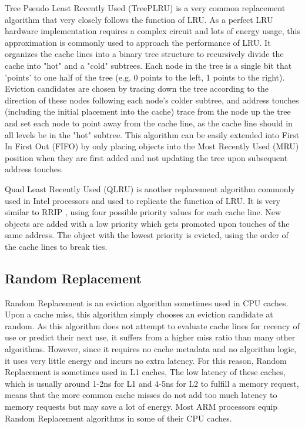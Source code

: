 \documentclass[letterpaper, twocolumn]{article}
\begin{document}
Tree Pseudo Least Recently Used (TreePLRU) is a very common replacement algorithm that
very closely follows the function of LRU.
As a perfect LRU hardware implementation requires a complex circuit and lots of energy usage,
this approximation is commonly used to approach the performance of LRU.
It organizes the cache lines into a binary tree structure to recursively divide the cache
into "hot" and a "cold" subtrees.
Each node in the tree is a single bit that 'points' to one half of the tree
(e.g. 0 points to the left, 1 points to the right).
Eviction candidates are chosen by tracing down the tree according to the direction of these nodes
following each node's colder subtree,
and address touches (including the initial placement into the cache)
trace from the node up the tree and set each node to point away from the cache line,
as the cache line should in all levels be in the "hot" subtree.
This algorithm can be easily extended into First In First Out (FIFO)
by only placing objects into the Most Recently Used (MRU) position when they are first added
and not updating the tree upon subsequent address touches.


Quad Least Recently Used (QLRU) is another replacement algorithm
commonly used in Intel processors and used to replicate the function of LRU.
It is very similar to RRIP \cite{RRIP}, using four possible priority values for each cache line.
New objects are added with a low priority which gets promoted upon touches of the same address.
The object with the lowest priority is evicted, using the order of the cache lines to break ties.

\subsection{Random Replacement}

Random Replacement is an eviction algorithm sometimes used in CPU caches.
Upon a cache miss, this algorithm simply chooses an eviction candidate at random.
As this algorithm does not attempt to evaluate cache lines for recency of use
or predict their next use, it suffers from a higher miss ratio than many other algorithms.
However, since it requires no cache metadata and no algorithm logic,
it uses very little energy and incurs no extra latency.
For this reason, Random Replacement is sometimes used in L1 caches,
The low latency of these caches, which is usually around 1-2ns for L1
and 4-5ns for L2 to fulfill a memory request,
means that the more common cache misses do not add too much latency to memory requests
but may save a lot of energy.
Most ARM processors equip Random Replacement algorithms in some of their CPU caches.
\end{document}
